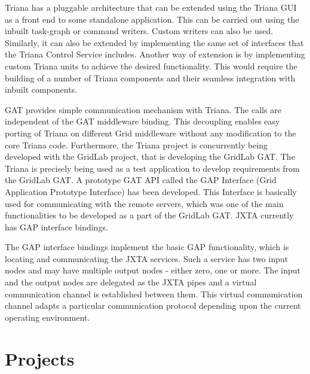 \documentclass[9pt,twocolumn,twoside]{styles/osajnl}
\begin{document}
Triana has a pluggable architecture that can be extended using the 
Triana GUI as a front end to some standalone application. This can be 
carried out using the inbuilt task-graph or command writers. Custom 
writers can also be used. Similarly, it can also be extended by 
implementing the same set of interfaces that the Triana Control Service 
includes. Another way of extension is by implementing custom Triana 
units to achieve the desired functionality. This would require the 
building of a number of Triana components and their seamless integration 
with inbuilt components.

GAT provides simple communication mechanism with Triana. The calls are 
independent of the GAT middleware binding. This decoupling enables easy 
porting of Triana on different Grid middleware without any modification 
to the core Triana code. Furthermore, the Triana project is concurrently 
being developed with the GridLab project, that is developing the GridLab 
GAT. The Triana is precisely being used as a test application to develop 
requirements from the GridLab GAT. A prototype GAT API called the GAP 
Interface (Grid Application Prototype Interface) has been developed. 
This Interface is basically used for communicating with the remote 
servers, which was one of the main functionalities to be developed as a 
part of the GridLab GAT. JXTA currently has GAP interface bindings. 

The GAP interface bindings implement the basic GAP functionality, which 
is locating and communicating the JXTA services. Such a service has two 
input nodes and may have multiple output nodes - either zero, one or 
more. The input and the output nodes are delegated as the JXTA pipes and 
a virtual communication channel is established between them. This 
virtual communication channel adapts a particular communication protocol 
depending upon the current operating environment. 

\section{Projects}
\end{document}
